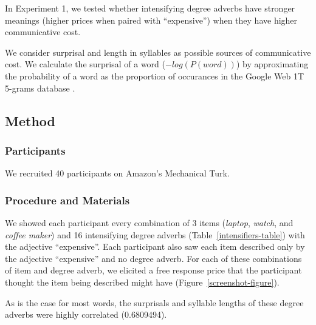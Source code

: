 \documentclass[10pt,letterpaper]{article}
\begin{document}
  In Experiment 1, we tested whether intensifying degree adverbs have stronger meanings (higher prices when paired with ``expensive'') when they have higher communicative cost.
  
  We consider surprisal and length in syllables as possible sources of communicative cost. We calculate the surprisal of a word ($-log(P(word))$) by approximating the probability of a word as the proportion of occurances in the Google Web 1T 5-grams database \cite{web1t5gram}.
  
  \subsection{Method}
    \subsubsection{Participants}
      We recruited 40 participants on Amazon's Mechanical Turk.
    \subsubsection{Procedure and Materials}
      We showed each participant every combination of 3 items (\emph{laptop}, \emph{watch}, and \emph{coffee maker}) and 16 intensifying degree adverbs (Table~\ref{intensifiers-table}) with the adjective ``expensive''. Each participant also saw each item described only by the adjective ``expensive'' and no degree adverb. For each of these combinations of item and degree adverb, we elicited a free response price that the participant thought the item being described might have (Figure~\ref{screenshot-figure}).
      
       As is the case for most words, the surprisals and syllable lengths of these degree adverbs were highly correlated (0.6809494).
      
\end{document}
